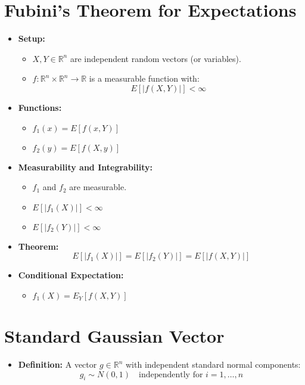 \documentclass{article}
\begin{document}
\section*{Fubini's Theorem for Expectations}

\begin{itemize}
    \item \textbf{Setup:}
    \begin{itemize}
        \item $X, Y \in \mathbb{R}^n$ are independent random vectors (or variables).
        \item $f : \mathbb{R}^n \times \mathbb{R}^n \to \mathbb{R}$ is a measurable function with:
        \[
        E[|f(X,Y)|] < \infty
        \]
    \end{itemize}
    
    \item \textbf{Functions:}
    \begin{itemize}
        \item $f_1(x) = E[f(x,Y)]$
        \item $f_2(y) = E[f(X,y)]$
    \end{itemize}
    
    \item \textbf{Measurability and Integrability:}
    \begin{itemize}
        \item $f_1$ and $f_2$ are measurable.
        \item $E[|f_1(X)|] < \infty$
        \item $E[|f_2(Y)|] < \infty$
    \end{itemize}
    
    \item \textbf{Theorem:}
    \[
    E[|f_1(X)|] = E[|f_2(Y)|] = E[|f(X,Y)|]
    \]

    \item \textbf{Conditional Expectation:}
    \begin{itemize}
        \item $f_1(X) = E_Y[f(X,Y)]$
    \end{itemize}
\end{itemize}












\section*{Standard Gaussian Vector}
\begin{itemize}
    \item \textbf{Definition:} A vector $g \in \mathbb{R}^n$ with independent standard normal components:
    \[
    g_i \sim N(0, 1) \quad \text{independently for } i = 1, \ldots, n
    \]
\end{itemize}
\end{document}
